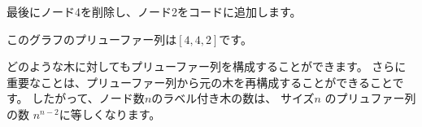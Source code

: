 最後にノード4を削除し、ノード2をコードに追加します。
\begin{center}
\end{center}

このグラフのプリューファー列は$[4,4,2]$です。

どのような木に対してもプリューファー列を構成することができます。
さらに重要なことは、プリューファー列から元の木を再構成することができることです。
したがって、ノード数$n$のラベル付き木の数は、
サイズ$n$ のプリュファー列の数 $n^{n-2}$に等しくなります。
